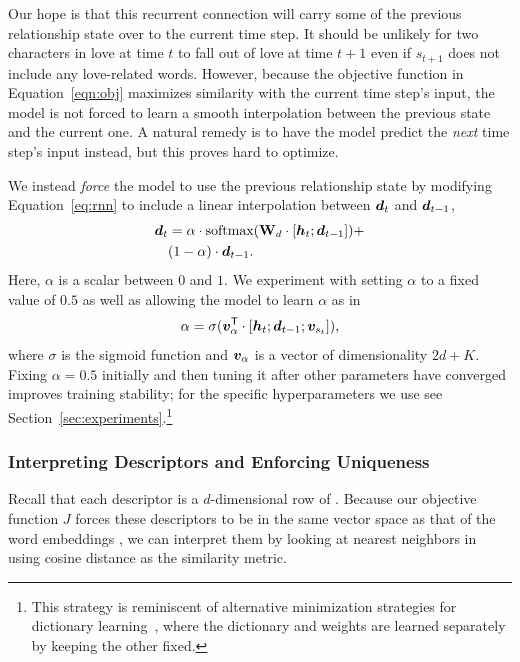 Our hope is that this recurrent connection will carry some of the previous
relationship state over to the current time step. It should be unlikely for two
characters in love at time $t$ to fall out of love at time $t+1$ even if
$s_{t+1}$ does not include any love-related words.  However, because the
objective function in Equation~\ref{eqn:obj} maximizes similarity with the
current time step's input, the model is not forced to learn a smooth
interpolation between the previous state and the current one. A natural remedy
is to have the model predict the \emph{next} time step's input instead, but this
proves hard to optimize.













We instead \emph{force} the model to use the previous relationship state by
modifying Equation~\ref{eq:rnn} to include a linear interpolation
between $\boldsymbol{d}_{t}$ and $\boldsymbol{d}_{t-1}$,
\begin{equation}\label{eq:rmn}
\begin{split}
	\boldsymbol{d}_t &= \alpha \cdot \text{softmax}(\text{\textbf{W}}_d\cdot [\boldsymbol{h}_t;\boldsymbol{d}_{t-1}]) + \\&(1-\alpha)\cdot \boldsymbol{d}_{t-1}.
\end{split}
\end{equation}
Here, $\alpha$ is a scalar between $0$ and $1$. We experiment with
setting $\alpha$ to a fixed value of $0.5$ as well as allowing the
model to learn $\alpha$ as in
\begin{equation}\label{eq:alpha}
	\alpha = \sigma(\boldsymbol{v}_\alpha^\mathsf{T} \cdot[\boldsymbol{h}_t;\boldsymbol{d}_{t-1};\boldsymbol{v}_{s_t}]),
\end{equation}
where $\sigma$ is the sigmoid function and $\boldsymbol{v}_\alpha$ is a vector of
dimensionality $2d+K$.  Fixing $\alpha=0.5$ initially and then tuning it after
other parameters have converged improves training stability; for the specific
hyperparameters we use see Section~\ref{sec:experiments}.\footnote{This strategy
  is reminiscent of alternative minimization strategies for dictionary
  learning~\cite{agarwallearning}, where the dictionary and weights are learned
  separately by keeping the other fixed.}

\subsubsection{Interpreting Descriptors and Enforcing Uniqueness}
Recall that each descriptor is a $d$-dimensional row of
. Because our objective function $J$ forces these descriptors
to be in the same vector space as that of the word embeddings , we can
interpret them by looking at nearest neighbors in  using
cosine distance as the similarity metric.

